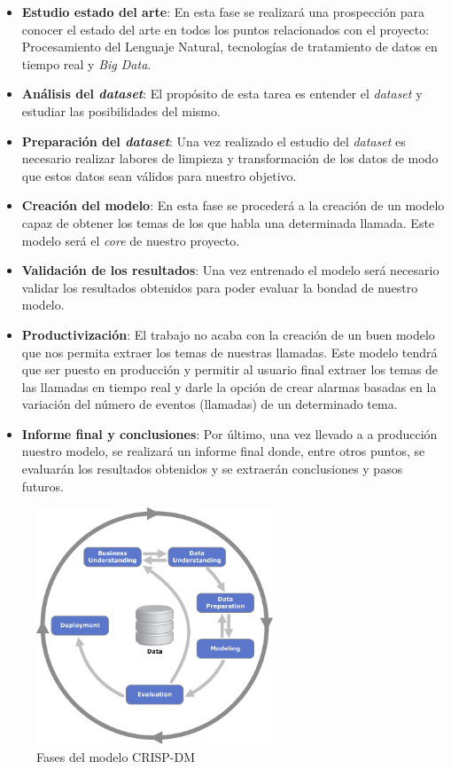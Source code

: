 \begin{itemize}
	\item \textbf{Estudio estado del arte}: En esta fase se realizará una prospección para conocer el estado del arte en todos los puntos relacionados con el proyecto: Procesamiento del Lenguaje Natural, tecnologías de tratamiento de datos en tiempo real y \textit{Big Data}. 
	
	\item \textbf{Análisis del \textit{dataset}}: El propósito de esta tarea es entender el \textit{dataset}  y estudiar las posibilidades del mismo. 
	
	\item\textbf{ Preparación del \textit{dataset}}: Una vez realizado el estudio del \textit{dataset} es necesario realizar labores de limpieza y transformación de los datos de modo que estos datos sean válidos para nuestro objetivo.
	
	\item \textbf{Creación del modelo}: En esta fase se procederá a la creación de un modelo capaz de obtener los temas de los que habla una determinada llamada. Este modelo será el \textit{core} de nuestro proyecto.
	
	\item \textbf{Validación de los resultados}: Una vez entrenado el modelo será necesario validar los resultados obtenidos para poder evaluar la bondad de nuestro modelo. 
	
	\item\textbf{ Productivización}: El trabajo no acaba con la creación de un buen modelo que nos permita extraer los temas de nuestras llamadas. Este modelo tendrá que ser puesto en producción y permitir al usuario final extraer los temas de las llamadas en tiempo real y darle la opción de crear alarmas basadas en la variación del número de eventos (llamadas) de un determinado tema.
	\item\textbf{ Informe final y conclusiones}: Por último, una vez llevado a a producción nuestro modelo, se realizará un informe final donde, entre otros puntos, se evaluarán los resultados obtenidos y se extraerán conclusiones y pasos futuros.
\end{itemize} 

\begin{figure}[!ht]
	\centering
	\includegraphics[width=0.63\textwidth]{images/intro/crispdm}
	\caption{Fases del modelo CRISP-DM}
	\label{fig:crispdm}
\end{figure}


